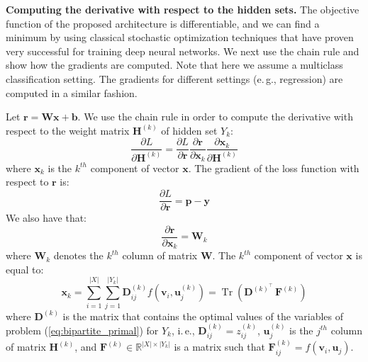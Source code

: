 \documentclass[twoside]{article}
\newcommand{\eg}{e.\,g., }
\newcommand{\ie}{i.\,e., }
\DeclareMathOperator{\Tr}{Tr}
\begin{document}
\textbf{Computing the derivative with respect to the hidden sets.}
The objective function of the proposed architecture is differentiable, and we can find a minimum by using classical stochastic optimization techniques that have proven very successful for training deep neural networks.
We next use the chain rule and show how the gradients are computed.
Note that here we assume a multiclass classification setting.
The gradients for different settings (\eg regression) are computed in a similar fashion.

Let $\mathbf{r} = \mathbf{W} \mathbf{x} + \mathbf{b}$.
We use the chain rule in order to compute the derivative with respect to the weight matrix $\mathbf{H}^{(k)}$ of hidden set $Y_k$:
\begin{equation}
    \frac{\partial L}{\partial \mathbf{H}^{(k)}} = \frac{\partial L}{\partial \mathbf{r}}\frac{\partial \mathbf{r}}{\partial \mathbf{x}_k} \frac{\partial \mathbf{x}_k}{\partial \mathbf{H}^{(k)}}
    \label{eq:der}
\end{equation}
where $\mathbf{x}_k$ is the $k^{th}$ component of vector $\mathbf{x}$.
The gradient of the loss function with respect to $\mathbf{r}$ is:
\begin{equation}
    \frac{\partial L}{\partial \mathbf{r}} = \mathbf{p} - \mathbf{y}
    \label{eq:der1}
\end{equation}
We also have that:
\begin{equation}
    \frac{\partial \mathbf{r}}{\partial \mathbf{x}_k} = \mathbf{W}_k
    \label{eq:der2}
\end{equation}
where $\mathbf{W}_k$ denotes the $k^{th}$ column of matrix $\mathbf{W}$.
The $k^{th}$ component of vector $\mathbf{x}$ is equal to:
\begin{equation*}
    \mathbf{x}_k = \sum_{i=1}^{|X|} \sum_{j=1}^{|Y_k|}\mathbf{D}^{(k)}_{ij}f(\mathbf{v}_i,\mathbf{u}^{(k)}_j) = \Tr(\mathbf{D}^{(k)^{\top}} \, \mathbf{F}^{(k)})
\end{equation*}
where $\mathbf{D}^{(k)}$ is the matrix that contains the optimal values of the variables of problem (\ref{eq:bipartite_primal}) for $Y_k$, \ie $\mathbf{D}^{(k)}_{ij} = z_{ij}^{(k)}$, $\mathbf{u}^{(k)}_j$ is the $j^{th}$ column of matrix $\mathbf{H}^{(k)}$, and $\mathbf{F}^{(k)} \in \mathbb{R}^{|X| \times |Y_k|}$ is a matrix such that $\mathbf{F}^{(k)}_{ij} = f(\textbf{v}_i,\textbf{u}_j)$.
\end{document}

